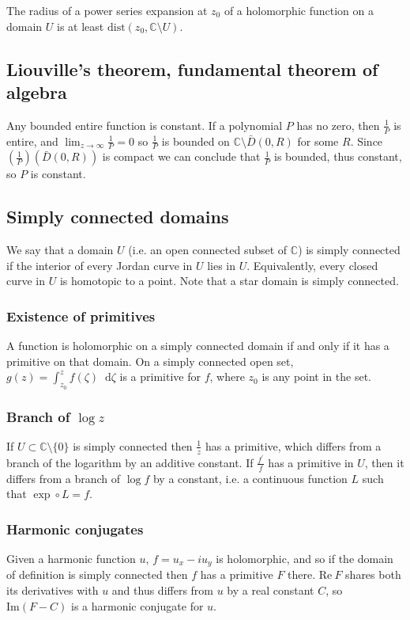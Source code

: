 \documentclass{article}
\newcommand\dif{\mathop{}\!\mathrm{d}}
\renewcommand{\Im}{\mathrm{Im}}
\renewcommand{\Re}{\mathrm{Re}}
\renewcommand{\Im}{\mathrm{Im}}
\begin{document}
The radius of a power series expansion at $z_0$ of a holomorphic function on a
domain $U$ is at least $\mathrm{dist}(z_0, \mathbb{C} \setminus U)$.

\subsection{Liouville's theorem, fundamental theorem of algebra}

Any bounded entire function is constant. If a polynomial $P$ has no
zero, then $\frac{1}{P}$ is entire, and
$\lim_{z \to \infty} \frac{1}{P} = 0$ so $\frac{1}{P}$ is bounded on
$\mathbb{C} \setminus \bar{D}(0, R)$ for some $R$. Since
$\left(\frac{1}{P}\right)(\bar{D}(0, R))$ is compact we can conclude
that $\frac{1}{P}$ is bounded, thus constant, so $P$ is constant.

\subsection{Simply connected domains}
We say that a domain $U$ (i.e. an open connected subset of $\mathbb{C}$)
is simply connected if the interior of every Jordan curve in $U$ lies
in $U$. Equivalently, every closed curve in $U$ is homotopic to a point.
Note that a star domain is simply connected.

\subsubsection{Existence of primitives}
A function is holomorphic on a simply connected domain if and only if
it has a primitive on that domain.
On a simply connected open set,
$g(z) = \int_{z_0}^z f(\zeta) \dif \zeta$ is a primitive for $f$,
where $z_0$ is any point in the set.

\subsubsection{Branch of $\log z$}
If $U \subset \mathbb{C} \setminus \{ 0 \}$ is simply connected then
$\frac{1}{z}$ has a primitive, which differs from a branch of the
logarithm by an additive constant. If $\frac{f^\prime}{f}$ has a
primitive in $U$, then it differs from a branch of $\log f$ by a
constant, i.e. a continuous function $L$ such that
$\exp \circ L = f$.

\subsubsection{Harmonic conjugates}
Given a harmonic function $u$, $f = u_x - i u_y$ is holomorphic, and so if
the domain of definition is simply connected then $f$ has a primitive
$F$ there. $\Re~F$ shares both its derivatives
with $u$ and thus differs from $u$ by a real constant $C$, so
$\Im(F - C)$ is a harmonic conjugate for $u$.
\end{document}
